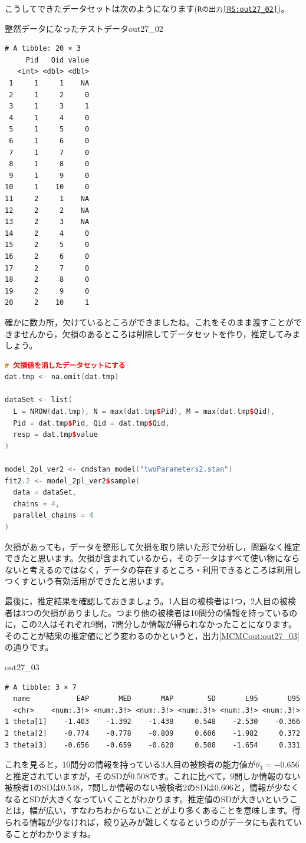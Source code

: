 \documentclass{ltjsbook}
\begin{document}
こうしてできたデータセットは次のようになります(\texttt{Rの出力\ref{RS:out27_02}})。
\begin{Rscreen}{整然データになったテストデータ}{out27_02}
	\begin{verbatim}
# A tibble: 20 × 3
     Pid   Qid value
   <int> <dbl> <dbl>
 1     1     1    NA
 2     1     2     0
 3     1     3     1
 4     1     4     0
 5     1     5     0
 6     1     6     0
 7     1     7     0
 8     1     8     0
 9     1     9     0
10     1    10     0
11     2     1    NA
12     2     2    NA
13     2     3    NA
14     2     4     0
15     2     5     0
16     2     6     0
17     2     7     0
18     2     8     0
19     2     9     0
20     2    10     1
    \end{verbatim}
\end{Rscreen}
確かに数カ所，欠けているところができましたね。これをそのまま渡すことができませんから，欠損のあるところは削除してデータセットを作り，推定してみましょう。
\begin{lstlisting}[language=c++,label={code:27_03},caption={データセットを作って推定する}]
# 欠損値を消したデータセットにする
dat.tmp <- na.omit(dat.tmp)

dataSet <- list(
  L = NROW(dat.tmp), N = max(dat.tmp$Pid), M = max(dat.tmp$Qid),
  Pid = dat.tmp$Pid, Qid = dat.tmp$Qid,
  resp = dat.tmp$value
)

model_2pl_ver2 <- cmdstan_model("twoParameters2.stan")
fit2.2 <- model_2pl_ver2$sample(
  data = dataSet,
  chains = 4,
  parallel_chains = 4
)
\end{lstlisting}
欠損があっても，データを整形して欠損を取り除いた形で分析し，問題なく推定できたと思います。欠損が含まれているから，そのデータはすべて使い物にならないと考えるのではなく，データの存在するところ・利用できるところは利用しつくすという有効活用ができたと思います。

最後に，推定結果を確認しておきましょう。1人目の被検者は1つ，2人目の被検者は3つの欠損がありました。つまり他の被検者は10問分の情報を持っているのに，この2人はそれぞれ9問，7問分しか情報が得られなかったことになります。
そのことが結果の推定値にどう変わるのかというと，出力\ref{MCMCout:out27_03}の通りです。
\begin{MCMCout}{}{out27_03}
	\begin{verbatim}
# A tibble: 3 × 7
  name           EAP       MED       MAP        SD       L95       U95
  <chr>    <num:.3!> <num:.3!> <num:.3!> <num:.3!> <num:.3!> <num:.3!>
1 theta[1]    -1.403    -1.392    -1.438     0.548    -2.530    -0.366
2 theta[2]    -0.774    -0.778    -0.809     0.606    -1.982     0.372
3 theta[3]    -0.656    -0.659    -0.620     0.508    -1.654     0.331
\end{verbatim}
\end{MCMCout}
これを見ると，10問分の情報を持っている3人目の被検者の能力値が$\theta_3 = -0.656$と推定されていますが，そのSDが0.508です。これに比べて，9問しか情報のない被検者1のSDは0.548，7問しか情報のない被検者2のSDは0.606と，情報が少なくなるとSDが大きくなっていくことがわかります。推定値のSDが大きいということは，幅が広い，すなわちわからないことがより多くあることを意味します。得られる情報が少なければ，絞り込みが難しくなるというのがデータにも表れていることがわかりますね。
\end{document}
